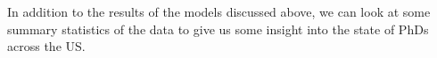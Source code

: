 In addition to the results of the models discussed above, we can look at some summary statistics of the data to give us some insight into the state of PhDs across the US.

